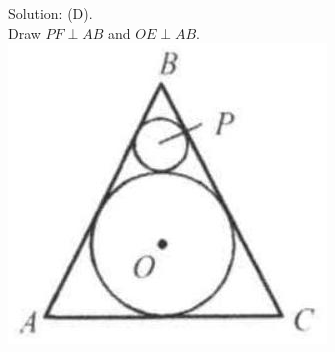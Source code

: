 \documentclass[10pt]{article}
\begin{document}
Solution: (D).\\
Draw \(P F \perp A B\) and \(O E \perp A B\).\\
\includegraphics[max width=\textwidth, center]{2025_04_17_97bc1f7e44d93c271a88g-176}
\end{document}
